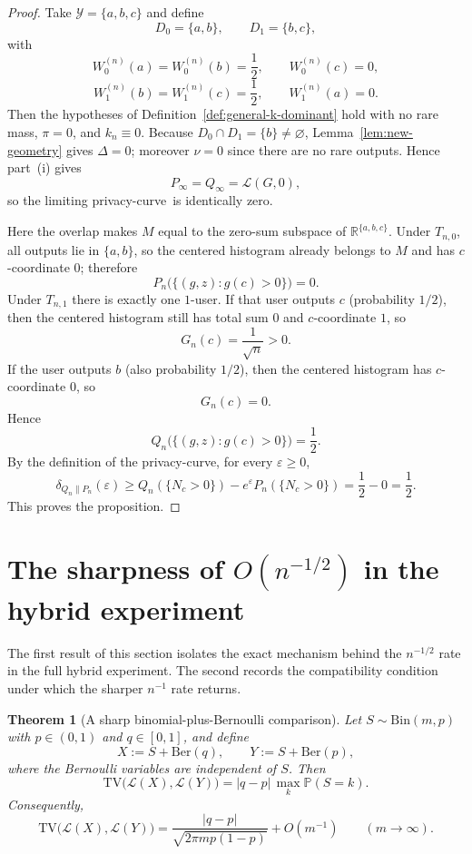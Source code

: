 \documentclass{article}
\newtheorem{theorem}{Theorem}[section]
\newcommand{\TV}{\mathrm{TV}}
\newcommand{\Bin}{\mathrm{Bin}}
\newcommand{\Pbb}{\mathbb P}
\newcommand{\R}{\mathbb R}
\newcommand{\1}{\mathbf 1}
\newcommand{\privacycurve}{\mbox{privacy-curve}}
\begin{document}
\begin{proof}
Take $\mathcal Y=\{a,b,c\}$ and define
\[
D_0=\{a,b\},
\qquad
D_1=\{b,c\},
\]
with
\[
W_0^{(n)}(a)=W_0^{(n)}(b)=\frac12,
\qquad
W_0^{(n)}(c)=0,
\]
\[
W_1^{(n)}(b)=W_1^{(n)}(c)=\frac12,
\qquad
W_1^{(n)}(a)=0.
\]
Then the hypotheses of Definition~\ref{def:general-k-dominant} hold with no rare mass, $\pi=0$, and $k_n\equiv 0$.
Because $D_0\cap D_1=\{b\}\neq\varnothing$, Lemma~\ref{lem:new-geometry} gives $\Delta=0$; moreover $\nu=0$ since
there are no rare outputs. Hence part~\textup{(i)} gives
\[
P_\infty=Q_\infty=\mathcal L(G,0),
\]
so the limiting \privacycurve\ is identically zero.

Here the overlap makes $M$ equal to the zero-sum subspace of $\R^{\{a,b,c\}}$. Under $T_{n,0}$, all outputs
lie in $\{a,b\}$, so the centered histogram already belongs to $M$ and has $c$-coordinate $0$; therefore
\[
P_n\bigl(\{(g,z):g(c)>0\}\bigr)=0.
\]
Under $T_{n,1}$ there is exactly one $1$-user. If that user outputs $c$ (probability $1/2$), then the centered
histogram still has total sum $0$ and $c$-coordinate $1$, so
\[
G_n(c)=\frac{1}{\sqrt n}>0.
\]
If the user outputs $b$ (also probability $1/2$), then the centered histogram has $c$-coordinate $0$, so
\[
G_n(c)=0.
\]
Hence
\[
Q_n\bigl(\{(g,z):g(c)>0\}\bigr)=\frac12.
\]
By the definition of the \privacycurve, for every $\varepsilon\ge 0$,
\[
\delta_{Q_n\|P_n}(\varepsilon)\ge Q_n(\{N_c>0\})-e^{\varepsilon}P_n(\{N_c>0\})=\frac12-0=\frac12.
\]
This proves the proposition.
\end{proof}

\section{The sharpness of \texorpdfstring{$O(n^{-1/2})$}{order n to minus one-half} in the hybrid experiment}
\label{sec:sharpness}

The first result of this section isolates the exact mechanism behind the $n^{-1/2}$ rate in the full hybrid
experiment. The second records the compatibility condition under which the sharper $n^{-1}$ rate returns.

\begin{theorem}[A sharp binomial-plus-Bernoulli comparison]
\label{thm:bin-ber-exact-tv}
Let $S\sim \Bin(m,p)$ with $p\in(0,1)$ and $q\in[0,1]$, and define
\[
X:=S+\mathrm{Ber}(q),
\qquad
Y:=S+\mathrm{Ber}(p),
\]
where the Bernoulli variables are independent of $S$. Then
\[
\TV\bigl(\mathcal L(X),\mathcal L(Y)\bigr)=|q-p|\,\max_k \Pbb(S=k).
\]
Consequently,
\[
\TV\bigl(\mathcal L(X),\mathcal L(Y)\bigr)
=
\frac{|q-p|}{\sqrt{2\pi mp(1-p)}}+O(m^{-1})
\qquad (m\to\infty).
\]
\end{theorem}
\end{document}
